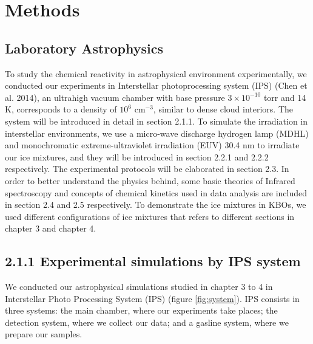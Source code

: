 \chapter{\protect Methods}

\section{Laboratory Astrophysics}
To study the chemical reactivity in astrophysical environment experimentally,
we conducted our experiments in Interstellar photoprocessing system (IPS) (Chen et al. 2014),
an ultrahigh vacuum chamber with base pressure $3 \times 10^{-10}$ torr and 14 K,
corresponds to a density of $10^6$ cm$^{-3}$, similar to dense cloud interiors.
The system will be introduced in detail in section 2.1.1.
To simulate the irradiation in interstellar environments,
we use a micro-wave discharge hydrogen lamp (MDHL) and monochromatic extreme-ultraviolet irradiation (EUV) 30.4 nm to irradiate our ice mixtures,
and they will be introduced in section 2.2.1 and 2.2.2 respectively.
The experimental protocols will be elaborated in section 2.3.
In order to better understand the physics behind, some basic theories of Infrared spectroscopy and concepts of chemical kinetics used in data analysis are included in section 2.4 and 2.5 respectively.
To demonstrate the ice mixtures in KBOs, we used different configurations of ice mixtures that refers to different sections in chapter 3 and chapter 4.\\

\section{2.1.1 Experimental simulations by IPS system}

We conducted our astrophysical simulations studied in chapter 3 to 4 in Interstellar Photo Processing System (IPS) (figure \ref{fig:system}). IPS consists in three systems: the main chamber, where our experiments take places; the detection system, where we collect our data; and a gasline system, where we prepare our samples.


